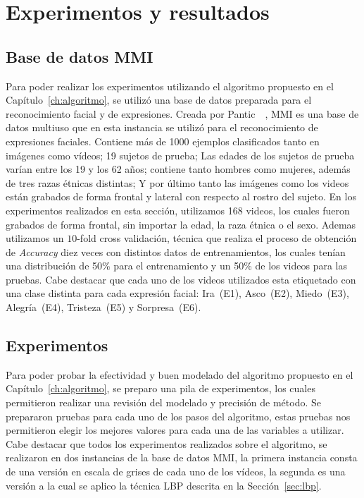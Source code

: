 \chapter[Experimentos y resultados]{Experimentos y resultados}
\label{ch:exp_result}

\section{Base de datos MMI}
\label{exp:bdd}
Para poder realizar los experimentos utilizando el algoritmo propuesto en el Capítulo~\ref{ch:algoritmo}, se utilizó una base de datos preparada para el reconocimiento facial y de expresiones. Creada por Pantic~\etal~\cite{Pantic2005}, MMI es una base de datos multiuso que en esta instancia se utilizó para el reconocimiento de expresiones faciales. Contiene más de 1000 ejemplos clasificados tanto en imágenes como vídeos; 19 sujetos de prueba; Las edades de los sujetos de prueba varían entre los 19 y los 62 años;  contiene tanto hombres como mujeres, además de tres razas étnicas distintas; Y por último tanto las imágenes como los videos están grabados de forma frontal y lateral con respecto al rostro del sujeto. En los experimentos realizados en esta sección, utilizamos 168 videos, los cuales fueron grabados de forma frontal, sin importar la edad, la raza étnica o el sexo. Ademas utilizamos un $10$-fold cross validación, técnica que realiza el proceso de obtención de \textit{Accuracy} diez veces con distintos datos de entrenamientos, los cuales tenían una distribución de 50\% para el entrenamiento y un 50\% de los videos para las pruebas. Cabe destacar que cada uno de los videos utilizados esta etiquetado con una clase distinta para cada expresión facial: Ira~(E1), Asco~(E2), Miedo~(E3), Alegría~(E4), Tristeza~(E5) y Sorpresa~(E6).

\section{Experimentos}
\label{exp:exp}

Para poder probar la efectividad y buen modelado del algoritmo propuesto en el Capítulo~\ref{ch:algoritmo}, se preparo una pila de experimentos, los cuales permitieron realizar una revisión del modelado y precisión de método.
Se prepararon pruebas para cada uno de los pasos del algoritmo, estas pruebas nos permitieron elegir los mejores valores para cada una de las variables a utilizar. Cabe destacar que todos los experimentos realizados sobre el algoritmo, se realizaron en dos instancias de la base de datos MMI, la primera instancia consta de una versión en escala de grises de cada uno de los vídeos, la segunda es una versión a la cual se aplico la técnica LBP descrita en la Sección~\ref{sec:lbp}.

